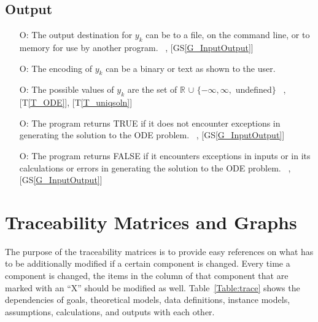 \documentclass[12pt]{article}
\newcommand{\tref}[1]{T\ref{#1}}
\newcommand{\gsref}[1]{GS\ref{#1}}
\newcounter{outputnum} %
\begin{document}
\subsection{Output} \label{sec_Output}

\begin{itemize}
\item[O\refstepcounter{outputnum}\theoutputnum \label{O_outputyk}:]
The output destination for $y_k$ can be to a file, on the command line, or to memory for use by
another program.
~\newline
[\gsref{G_SolveForY}], [\gsref{G_InputOutput}]


\item[O\refstepcounter{outputnum}\theoutputnum \label{O_encodingyk}:]
The encoding of $y_k$ can be a binary or text as shown to the user.
~\newline
[\gsref{G_InputOutput}]

\item[O\refstepcounter{outputnum}\theoutputnum \label{O_valuesyk}:]
The possible values of $y_k$ are the set of $\mathbb{R}$
$\cup$ $\{-\infty, \infty,$ undefined$\}$
~\newline
[\gsref{G_SolveForY}], [\tref{T_ODE}], [\tref{T_uniqsoln}]

\item[O\refstepcounter{outputnum}\theoutputnum \label{O_success}:]
The program returns TRUE if it does not encounter exceptions in generating the solution
to the ODE problem.
~\newline
[\gsref{G_SolveForY}], [\gsref{G_InputOutput}]

\item[O\refstepcounter{outputnum}\theoutputnum \label{O_fail}:]
The program returns FALSE if it encounters exceptions in inputs or in its calculations
or errors in generating the solution to the ODE problem.
~\newline
[\gsref{G_SolveForY}], [\gsref{G_InputOutput}]

\end{itemize}

\newpage

\section{Traceability Matrices and Graphs}

The purpose of the traceability matrices is to provide easy references on what has to be additionally modified if a certain component is changed.  Every time a 
component is changed, the items in the column of that component that are 
marked with an ``X'' should be modified as well.  Table~\ref{Table:trace}
shows the dependencies of goals, theoretical models, data
definitions, instance models, assumptions, calculations, and outputs with each other.
\end{document}
